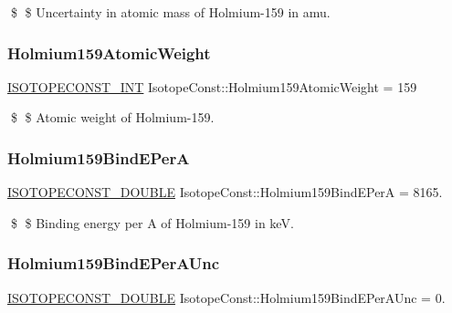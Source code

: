 \$ \$ Uncertainty in atomic mass of Holmium-\/159 in amu. \mbox{\label{group___isotope_const-_holmium-_ho159_ga4aff6dd922ec4a16517ec87341fa4a70}} 
\subsubsection{\texorpdfstring{Holmium159\+Atomic\+Weight}{Holmium159AtomicWeight}}
{\footnotesize\ttfamily \mbox{\hyperlink{group___isotope_const-_macros_ga5f18360b3e99483a35c32d789e62621c}{I\+S\+O\+T\+O\+P\+E\+C\+O\+N\+S\+T\+\_\+\+I\+NT}} Isotope\+Const\+::\+Holmium159\+Atomic\+Weight = 159}

\$ \$ Atomic weight of Holmium-\/159. \mbox{\label{group___isotope_const-_holmium-_ho159_ga9c31e1cc10ae1b36f9e7b46ba4caff6f}} 
\subsubsection{\texorpdfstring{Holmium159\+Bind\+E\+PerA}{Holmium159BindEPerA}}
{\footnotesize\ttfamily \mbox{\hyperlink{group___isotope_const-_macros_ga8f45a7272ce02c0b4c65c44636ed719a}{I\+S\+O\+T\+O\+P\+E\+C\+O\+N\+S\+T\+\_\+\+D\+O\+U\+B\+LE}} Isotope\+Const\+::\+Holmium159\+Bind\+E\+PerA = 8165.}

\$ \$ Binding energy per A of Holmium-\/159 in keV. \mbox{\label{group___isotope_const-_holmium-_ho159_gaa880dea00ad7131c728f269099978dbd}} 
\subsubsection{\texorpdfstring{Holmium159\+Bind\+E\+Per\+A\+Unc}{Holmium159BindEPerAUnc}}
{\footnotesize\ttfamily \mbox{\hyperlink{group___isotope_const-_macros_ga8f45a7272ce02c0b4c65c44636ed719a}{I\+S\+O\+T\+O\+P\+E\+C\+O\+N\+S\+T\+\_\+\+D\+O\+U\+B\+LE}} Isotope\+Const\+::\+Holmium159\+Bind\+E\+Per\+A\+Unc = 0.}

